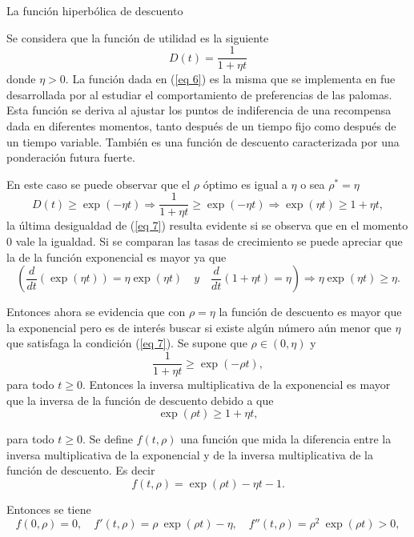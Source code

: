 \begin{exmpl}\label{ex 2}
La función hiperbólica de descuento

Se considera que la función de utilidad es la siguiente
\begin{equation}
\label{eq 6}
    D(t)=\dfrac{1}{1+\eta t}
\end{equation}
donde $ \eta > 0$. La función dada en (\ref{eq 6}) es la misma que se implementa en \parencite{feigenbaum2021deviation} fue desarrollada por \parencite{mazur1987adjusting} al estudiar el comportamiento de preferencias de las palomas. Esta función se deriva al ajustar los puntos de indiferencia de una recompensa dada en diferentes momentos, tanto después de un tiempo fijo como después de un tiempo variable. También es una función de descuento caracterizada por una ponderación futura fuerte.

En este caso se puede observar que el $\rho$ óptimo es igual a $\eta$ o sea $\rho^* = \eta$ 
%
\begin{equation}
\label{eq 7}
    D(t) \geq \exp(-\eta t) \Rightarrow \dfrac{1}{1+\eta t}\geq \exp(-\eta t) \Rightarrow \exp(\eta t) \geq 1+ \eta t,
\end{equation}
la última desigualdad de (\ref{eq 7}) resulta evidente si se observa que en el momento 0 vale la igualdad. Si se comparan las tasas de crecimiento se puede apreciar que la de la función exponencial es mayor ya que
    $$\left( \dfrac{d}{dt}  (\exp(\eta t)) = \eta  \exp(\eta t) \quad y \quad \dfrac{d}{dt} (1+ \eta t) = \eta \right) \Rightarrow \eta  \exp(\eta t) \geq \eta.$$

Entonces ahora se evidencia que con $\rho= \eta$ la función de descuento es mayor que la exponencial pero es de interés buscar si existe algún número aún menor que $\eta$ que satisfaga la condición (\ref{eq 7}). Se supone que $\rho \in (0, \eta)$ y
$$\dfrac{1}{1+\eta t} \geq \exp(- \rho t),$$
para todo $t \geq 0$. Entonces la inversa multiplicativa de la exponencial es mayor que la inversa de la función de descuento debido a que
\begin{equation}
\label{eq 8}
    \exp(\rho t) \geq 1+ \eta t,
\end{equation}

para todo $t \geq 0$. Se define $f(t, \rho)$ una función que mida la diferencia entre la inversa multiplicativa de la exponencial y de la inversa multiplicativa de la función de descuento. Es decir
$$f(t, \rho)=\exp(\rho t) - \eta t -1.$$

Entonces se tiene
$$f(0, \rho)=0, \quad
f'(t, \rho)=\rho \: \exp(\rho t) - \eta, \quad
f''(t, \rho)=\rho^2 \: \exp(\rho t) >0,$$


\end{exmpl}
